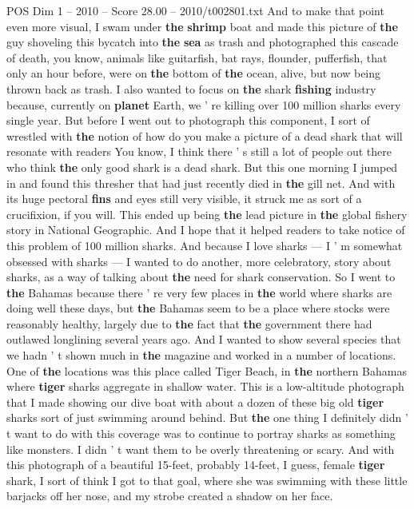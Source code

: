\begin{textsample}{POS Dim 1 – 2010 – Score 28.00 – 2010/t002801.txt}
And to make that point even more visual, I swam under \textbf{the} \textbf{shrimp} boat and made this picture of \textbf{the} guy shoveling this bycatch into \textbf{the} \textbf{sea} as trash and photographed this cascade of death, you know, animals like guitarfish, bat rays, flounder, pufferfish, that only an hour before, were on \textbf{the} bottom of \textbf{the} ocean, alive, but now being thrown back as trash.
I also wanted to focus on \textbf{the} shark \textbf{fishing} industry because, currently on \textbf{planet} Earth, we ' re killing over 100 million sharks every single year.
But before I went out to photograph this component, I sort of wrestled with \textbf{the} notion of how do you make a picture of a dead shark that will resonate with readers You know, I think there ' s still a lot of people out there who think \textbf{the} only good shark is a dead shark.
But this one morning I jumped in and found this thresher that had just recently died in \textbf{the} gill net.
And with its huge pectoral \textbf{fins} and eyes still very visible, it struck me as sort of a crucifixion, if you will.
This ended up being \textbf{the} lead picture in \textbf{the} global fishery story in National Geographic.
And I hope that it helped readers to take notice of this problem of 100 million sharks.
And because I love sharks — I ' m somewhat obsessed with sharks — I wanted to do another, more celebratory, story about sharks, as a way of talking about \textbf{the} need for shark conservation.
So I went to \textbf{the} Bahamas because there ' re very few places in \textbf{the} world where sharks are doing well these days, but \textbf{the} Bahamas seem to be a place where stocks were reasonably healthy, largely due to \textbf{the} fact that \textbf{the} government there had outlawed longlining several years ago.
And I wanted to show several species that we hadn ' t shown much in \textbf{the} magazine and worked in a number of locations.
One of \textbf{the} locations was this place called Tiger Beach, in \textbf{the} northern Bahamas where \textbf{tiger} sharks aggregate in shallow water.
This is a low-altitude photograph that I made showing our dive boat with about a dozen of these big old \textbf{tiger} sharks sort of just swimming around behind.
But \textbf{the} one thing I definitely didn ' t want to do with this coverage was to continue to portray sharks as something like monsters.
I didn ' t want them to be overly threatening or scary.
And with this photograph of a beautiful 15-feet, probably 14-feet, I guess, female \textbf{tiger} shark, I sort of think I got to that goal, where she was swimming with these little barjacks off her nose, and my strobe created a shadow on her face.

\end{textsample}
